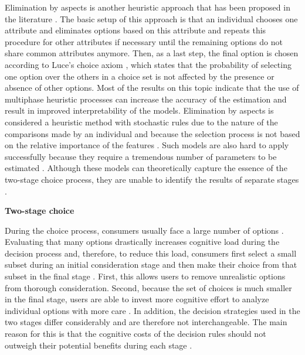\documentclass[a4paper,12pt]{article}
\begin{document}
Elimination by aspects is another heuristic approach that has been
proposed in the literature \citep{tversky1972elimination}. The basic setup of this approach is that an individual chooses one attribute and eliminates options based on this attribute and repeats this procedure for other attributes if necessary until the remaining options do not share common attributes anymore. Then, as a last step, the final option is chosen according to Luce's choice axiom \citep{luce2012individual}, which states that the probability of selecting one option over the others in a choice set is not affected by the presence or absence of other options. Most of the results on this topic \citep{batsell1985new,gensch1987two,currim1988disaggregate,manrai1989elimination} indicate that the use of multiphase heuristic processes can increase the accuracy of the estimation and result in improved interpretability of the models. Elimination by aspects is considered a heuristic method with stochastic rules due to the nature of the comparisons made by an individual and because the selection process is not based on the relative importance of the features
\citep{aribarg2018advancing}. Such models are also hard to apply successfully because they require a tremendous number of parameters to be estimated \citep{batsell1985new}. Although these models can theoretically capture the essence of the two-stage choice process, they are unable to identify the results of separate stages \citep{gilbride2004choice}. 

\textbf{Two-stage choice}

During the choice process, consumers usually face a large number of options \citep{payne1988adaptive}. Evaluating that many options drastically increases cognitive load during the decision process and, therefore, to reduce this load, consumers first select a small subset during an initial consideration stage \citep{paulssen2005self} and then make their choice from that subset in the final stage \citep{bettman1979memory, gensch1987two, paulssen2005self}. First, this allows users to remove unrealistic options from thorough consideration. Second, because the set of choices is much smaller in the final stage, users are able to invest more cognitive effort to analyze individual options with more care \citep{gensch1987two}. In addition, the decision strategies used in the two stages differ considerably and are therefore not interchangeable. The main reason for this is that the cognitive costs of the decision rules should not outweigh their potential benefits during each stage \citep{bettman1990componential}.
\end{document}
